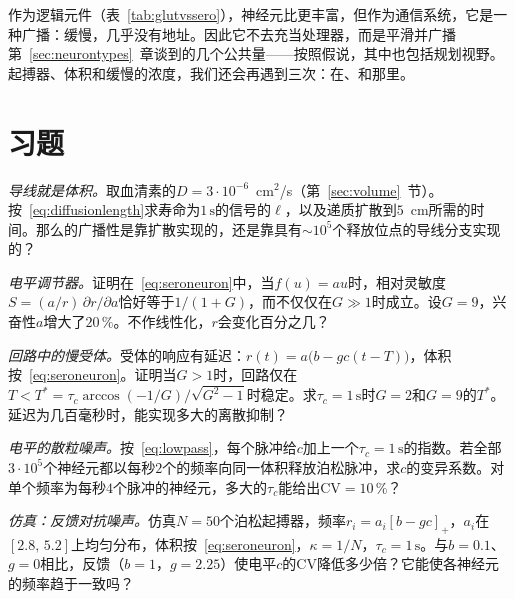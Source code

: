 作为逻辑元件（表~\ref{tab:glutvssero}），神经元比更丰富，但作为通信系统，它是一种广播：缓慢，几乎没有地址。因此它不去充当处理器，而是平滑并广播第~\ref{sec:neurontypes}~章谈到的几个公共量——按照假说，其中也包括规划视野。起搏器、体积和缓慢的浓度，我们还会再遇到三次：在、和那里。

\section{习题}

\begin{exercise}[\lvlA]
\label{ex:05:1}
\emph{导线就是体积。}取血清素的$D=3\cdot10^{-6}$~cm$^2$/s（第~\ref{sec:volume}~节）。按~\eqref{eq:diffusionlength}求寿命为$1\,\text{s}$的信号的$\ell$，以及递质扩散到$5$~cm所需的时间。那么的广播性是靠扩散实现的，还是靠具有$\sim10^5$个释放位点的导线分支实现的？
\end{exercise}

\begin{exercise}[\lvlA]
\label{ex:05:2}
\emph{电平调节器。}证明在~\eqref{eq:seroneuron}中，当$f(u)=au$时，相对灵敏度$S=(a/r)\,\partial r/\partial a$恰好等于$1/(1+G)$，而不仅仅在$G\gg1$时成立。设$G=9$，兴奋性$a$增大了$20\,\%$。不作线性化，$r$会变化百分之几？
\end{exercise}

\begin{exercise}[\lvlB]
\label{ex:05:3}
\emph{回路中的慢受体。}受体的响应有延迟：$r(t)=a\bigl(b-gc(t-T)\bigr)$，体积按~\eqref{eq:seroneuron}。证明当$G>1$时，回路仅在$T<T^*=\tau_c\arccos(-1/G)/\sqrt{G^2-1}$时稳定。求$\tau_c=1\,\text{s}$时$G=2$和$G=9$的$T^*$。延迟为几百毫秒时，能实现多大的离散抑制？
\end{exercise}

\begin{exercise}[\lvlB]
\label{ex:05:4}
\emph{电平的散粒噪声。}按~\eqref{eq:lowpass}，每个脉冲给$c$加上一个$\tau_c=1\,\text{s}$的指数。若全部$3\cdot10^5$个神经元都以每秒$2$个的频率向同一体积释放泊松脉冲，求$c$的变异系数。对单个频率为每秒$4$个脉冲的神经元，多大的$\tau_c$能给出$\mathrm{CV}=10\,\%$？
\end{exercise}

\begin{exercise}[\lvlB]
\label{ex:05:5}
\emph{仿真：反馈对抗噪声。}仿真$N=50$个泊松起搏器，频率$r_i=a_i[b-gc]_+$，$a_i$在$[2.8,\,5.2]$上均匀分布，体积按~\eqref{eq:seroneuron}，$\kappa=1/N$，$\tau_c=1\,\text{s}$。与$b=0.1$、$g=0$相比，反馈（$b=1$，$g=2.25$）使电平$c$的CV降低多少倍？它能使各神经元的频率趋于一致吗？
\end{exercise}

